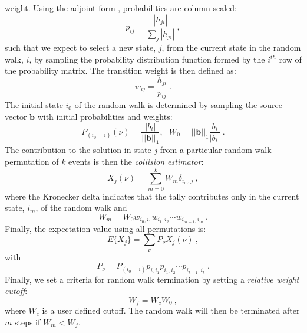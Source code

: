 \documentclass{snamc2013}
\begin{document}
weight. Using the adjoint form \cite{spanier_monte_1969},
probabilities are column-scaled:
\begin{equation}
  p_{ij} = \frac{|h_{ji}|}{\sum_j |h_{ji}|}\:,
  \label{eq:adjoint_probability}
\end{equation}
such that we expect to select a new state, $j$, from the current state
in the random walk, $i$, by sampling the probability distribution
function formed by the $i^{th}$ row of the probability matrix. The
transition weight is then defined as:
\begin{equation}
  w_{ij} = \frac{h_{ji}}{p_{ij}}\:.
  \label{eq:adjoint_weight}
\end{equation}
The initial state $i_0$ of the random walk is determined by sampling
the source vector $\mathbf{b}$ with initial probabilities and weights:
\begin{equation}
  P_{(i_0=i)}(\nu) = \frac{|b_i|}{||\mathbf{b}||_1},\ \ \ W_0 =
  ||\mathbf{b}||_1 \frac{b_i}{|b_i|}\:.
  \label{eq:adjoint_starting_params}
\end{equation}
The contribution to the solution in state $j$ from a particular random
walk permutation of $k$ events is then the \textit{collision
  estimator}:
\begin{equation}
  X_{j}(\nu) = \sum_{m=0}^k W_{m} \delta_{i_m,j}\:,
  \label{eq:adjoint_permutation_contribution}
\end{equation}
where the Kronecker delta indicates that the tally contributes only in
the current state, $i_m$, of the random walk and 
\begin{equation}
  W_{m} = W_0 w_{i_0,i_1} w_{i_1,i_2} \cdots w_{i_{m-1},i_m}\:.
  \label{eq:adjoint_permutation_weight}
\end{equation}
Finally, the expectation value using all permutations is:
\begin{equation}
  E\{X_j\} = \sum_{\nu} P_{\nu} X_{j}(\nu)\:,
  \label{eq:adjoint_expectation_value}
\end{equation}
with
\begin{equation}
  P_{\nu} = P_{(i_0=i)} p_{i,i_1} p_{i_1,i_2} \cdots p_{i_{k-1},i_k}\:.
  \label{eq:adjoint_permutation_probability}
\end{equation}
Finally, we set a criteria for random walk termination by setting a
\textit{relative weight cutoff}:
\begin{equation}
  W_f = W_c W_0\:,
  \label{eq:relative_weight_cutoff}
\end{equation}
where $W_c$ is a user defined cutoff. The random walk will then be
terminated after $m$ steps if $W_m < W_f$.
\end{document}
